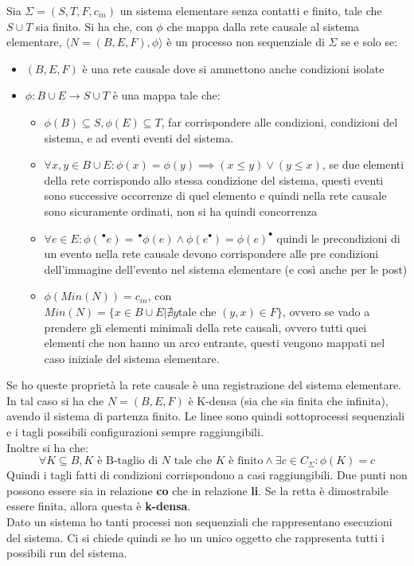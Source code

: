 Sia $\Sigma=(S,T,F,c_{in})$ un sistema elementare senza contatti e finito, tale che $S\cup T$ sia finito. Si ha che, con $\phi$ che mappa dalla rete causale al sistema elementare, $\langle N=(B,E,F), \phi\rangle$ è un processo non sequenziale di $\Sigma$ se e solo se:
\begin{itemize}
    \item $(B,E,F)$ è una rete causale dove si ammettono anche condizioni isolate
    \item $\phi:B\cup E \to S\cup T$ è una mappa tale che:
    \begin{itemize}
      \item $\phi(B)\subseteq S, \phi(E)\subseteq T$, far corrispondere alle condizioni, condizioni del sistema, e ad eventi eventi del sistema. 
      \item $\forall x,y\in B\cup E:\phi(x)=\phi(y)\implies (x\leq y)\lor (y\leq x)$, se due elementi della rete corrispondo allo stessa condizione del sistema, questi eventi sono successive occorrenze di quel elemento e quindi nella rete causale sono sicuramente ordinati, non si ha quindi concorrenza
      \item $\forall e\in E:\phi(\,^\bullet e)=\,^\bullet \phi(e)\land\phi(e^\bullet)=\phi(e)^\bullet$ quindi le precondizioni di un evento nella rete causale devono corrispondere alle pre condizioni dell'immagine dell'evento nel sistema elementare (e così anche per le post)
      \item $\phi(Min(N))=c_{in}$, con $Min(N)=\{x\in B\cup E|\nexists y \mbox{tale che }(y,x)\in F\}$, ovvero se vado a prendere gli elementi minimali della rete causali, ovvero tutti quei elementi che non hanno un arco entrante, questi vengono mappati nel caso iniziale del sistema elementare.
    \end{itemize}
\end{itemize}
Se ho queste proprietà la rete causale è una registrazione del sistema elementare.\\ 
In tal caso si ha che $N=(B,E,F)$ è K-densa (sia che sia finita che infinita), avendo il sistema di partenza finito. Le linee sono quindi sottoprocessi sequenziali e i tagli possibili configurazioni sempre raggiungibili.\\ Inoltre si ha che:
\[\forall K \subseteq B, K\mbox{ è B-taglio di } N \mbox{ tale che } K \mbox{ è finito} \land \exists c\in C_\Sigma:\phi(K)=c\] 
Quindi i tagli fatti di condizioni corrispondono a casi raggiungibili. Due punti non possono essere sia in relazione \textbf{co} che in relazione \textbf{li}. Se la retta è dimostrabile essere finita, allora questa è \textbf{k-densa}.\\

Dato un sistema ho tanti processi non sequenziali che rappresentano esecuzioni del sistema. Ci si chiede quindi se ho un unico oggetto che rappresenta tutti i possibili run del sistema.

